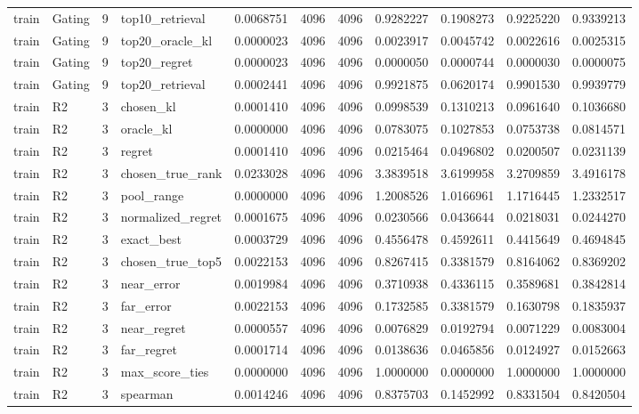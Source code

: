 \begin{tabular}{llrlrrrrrrr}
train & Gating & 9 & top10_retrieval & 0.0068751 & 4096 & 4096 & 0.9282227 & 0.1908273 & 0.9225220 & 0.9339213 \\
train & Gating & 9 & top20_oracle_kl & 0.0000023 & 4096 & 4096 & 0.0023917 & 0.0045742 & 0.0022616 & 0.0025315 \\
train & Gating & 9 & top20_regret & 0.0000023 & 4096 & 4096 & 0.0000050 & 0.0000744 & 0.0000030 & 0.0000075 \\
train & Gating & 9 & top20_retrieval & 0.0002441 & 4096 & 4096 & 0.9921875 & 0.0620174 & 0.9901530 & 0.9939779 \\
train & R2 & 3 & chosen_kl & 0.0001410 & 4096 & 4096 & 0.0998539 & 0.1310213 & 0.0961640 & 0.1036680 \\
train & R2 & 3 & oracle_kl & 0.0000000 & 4096 & 4096 & 0.0783075 & 0.1027853 & 0.0753738 & 0.0814571 \\
train & R2 & 3 & regret & 0.0001410 & 4096 & 4096 & 0.0215464 & 0.0496802 & 0.0200507 & 0.0231139 \\
train & R2 & 3 & chosen_true_rank & 0.0233028 & 4096 & 4096 & 3.3839518 & 3.6199958 & 3.2709859 & 3.4916178 \\
train & R2 & 3 & pool_range & 0.0000000 & 4096 & 4096 & 1.2008526 & 1.0166961 & 1.1716445 & 1.2332517 \\
train & R2 & 3 & normalized_regret & 0.0001675 & 4096 & 4096 & 0.0230566 & 0.0436644 & 0.0218031 & 0.0244270 \\
train & R2 & 3 & exact_best & 0.0003729 & 4096 & 4096 & 0.4556478 & 0.4592611 & 0.4415649 & 0.4694845 \\
train & R2 & 3 & chosen_true_top5 & 0.0022153 & 4096 & 4096 & 0.8267415 & 0.3381579 & 0.8164062 & 0.8369202 \\
train & R2 & 3 & near_error & 0.0019984 & 4096 & 4096 & 0.3710938 & 0.4336115 & 0.3589681 & 0.3842814 \\
train & R2 & 3 & far_error & 0.0022153 & 4096 & 4096 & 0.1732585 & 0.3381579 & 0.1630798 & 0.1835937 \\
train & R2 & 3 & near_regret & 0.0000557 & 4096 & 4096 & 0.0076829 & 0.0192794 & 0.0071229 & 0.0083004 \\
train & R2 & 3 & far_regret & 0.0001714 & 4096 & 4096 & 0.0138636 & 0.0465856 & 0.0124927 & 0.0152663 \\
train & R2 & 3 & max_score_ties & 0.0000000 & 4096 & 4096 & 1.0000000 & 0.0000000 & 1.0000000 & 1.0000000 \\
train & R2 & 3 & spearman & 0.0014246 & 4096 & 4096 & 0.8375703 & 0.1452992 & 0.8331504 & 0.8420504 \\

\end{tabular}
